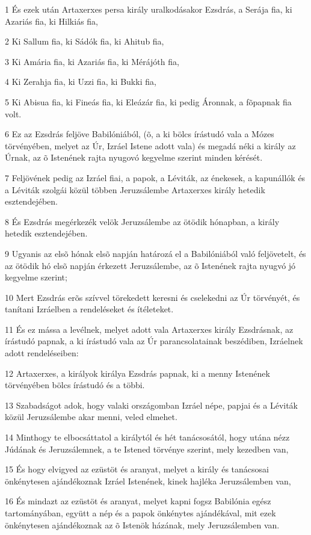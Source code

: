 {\par 1 És ezek után Artaxerxes persa király uralkodásakor Ezsdrás, a Serája fia, ki Azariás fia, ki Hilkiás fia,
\par 2 Ki Sallum fia, ki Sádók fia, ki Ahitub fia,
\par 3 Ki Amária fia, ki Azariás fia, ki Mérájóth fia,
\par 4 Ki Zerahja fia, ki Uzzi fia, ki Bukki fia,
\par 5 Ki Abisua fia, ki Fineás fia, ki Eleázár fia, ki pedig Áronnak, a fõpapnak fia volt.
\par 6 Ez az Ezsdrás feljöve Babilóniából, (õ, a ki bölcs írástudó vala a Mózes törvényében, melyet az Úr, Izráel Istene adott vala) és megadá néki a király az Úrnak, az õ Istenének rajta nyugovó kegyelme szerint minden kérését.
\par 7 Feljövének pedig az Izráel fiai, a papok, a Léviták, az énekesek, a kapunállók és a Léviták szolgái közül többen Jeruzsálembe Artaxerxes király hetedik esztendejében.
\par 8 És Ezsdrás megérkezék velök Jeruzsálembe az ötödik hónapban, a király hetedik esztendejében.
\par 9 Ugyanis az elsõ hónak elsõ napján határozá el a Babilóniából való feljövetelt, és az ötödik hó elsõ napján érkezett Jeruzsálembe, az õ Istenének rajta nyugvó jó kegyelme szerint;
\par 10 Mert Ezsdrás erõs szívvel törekedett keresni és cselekedni az Úr törvényét, és tanítani Izráelben a rendeléseket és ítéleteket.
\par 11 És ez mássa a levélnek, melyet adott vala Artaxerxes király Ezsdrásnak, az írástudó papnak, a ki írástudó vala az Úr parancsolatainak beszédiben, Izráelnek adott rendeléseiben:
\par 12 Artaxerxes, a királyok királya Ezsdrás papnak, ki a menny Istenének törvényében bölcs írástudó és a többi.
\par 13 Szabadságot adok, hogy valaki országomban Izráel népe, papjai és a Léviták közül Jeruzsálembe akar menni, veled elmehet.
\par 14 Minthogy te elbocsáttatol a királytól és hét tanácsosától, hogy utána nézz Júdának és Jeruzsálemnek, a te Istened törvénye szerint, mely kezedben van,
\par 15 És hogy elvigyed az ezüstöt és aranyat, melyet a király és tanácsosai önkénytesen ajándékoznak Izráel Istenének, kinek hajléka Jeruzsálemben van,
\par 16 És mindazt az ezüstöt és aranyat, melyet kapni fogsz Babilónia egész tartományában, együtt a nép és a papok önkénytes ajándékával, mit ezek önkénytesen ajándékoznak az õ Istenök házának, mely Jeruzsálemben van.
}
